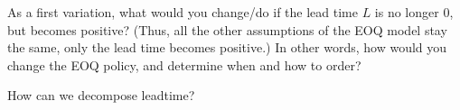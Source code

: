 \begin{exercise}
  As a first variation, what would you change/do if the lead time $L$
  is no longer 0, but becomes positive? (Thus, all the other
  assumptions of the EOQ model stay the same, only the lead time
  becomes positive.)  In other words, how would you change the EOQ
  policy, and determine when and how to order?
  \begin{comment}
    Since the backlog costs are infinite, backlogging is not
    desirable, hence we order early. See the graph: 
\begin{center}
\begin{tikzpicture}[x=0.75cm,y=0.015cm]
\small
\draw[thick,->] (0,0) -- (11,0) node[right] {Time};
\draw[thick,->] (0,0) -- (0,250) node[above] {Inventory};
\draw[] (0,200) -- (0,200) node[left] {$Q$};
\draw[color=blue,thick] (0,200) -- (3,0);
\draw[] (3,0) node[below] {$Q / D$};
\foreach \y in {1,...,3}{
	\draw[color=blue,thick] (3*\y-3,200) -- (3*\y,0);
	\draw[color=green,thick] (3*\y-3+2,200/3) -- (3*\y-3+2,200/3*4) -- (3*\y,200);
	\draw[color=red,thick,<->] (3*\y-3+2,200/3*2) -- (3*\y,200/3*2);
	\draw[] (3*\y-3+2.5,200/3*2) node[below] {$L$};}
\foreach \y in {1,2}{
	\draw[color=blue,thick] (3*\y,0) -- (3*\y,200);}
\foreach \y in {2,3}{
	\draw[] (3*\y,-5) node[below] {\y $Q/D$};}
\draw[] (0,100) node[left] {$Q / 2$};
\draw[color=red,thick] (0,100) -- (10.5,100) node[below] {Average stock};
\draw[] (0,200/3) node[left] {$L D$};
\draw[color=red,thick] (0,200/3) -- (10.5,200/3) node[below] {Re-order level};
\foreach \y in {0,...,2}{
	\draw[color=red,thick,<->] (3*\y+0.15,-45) -- (3*\y+3-0.15,-45);
	\draw[] (3*\y+1.5,-45) -- (3*\y+1.5,-45) node[below] {Cycle};}
\end{tikzpicture}
\end{center}
    
This new policy can be described in a simple way by introducing the
concept of \emph{inventory position}, that is, all stock on-hand plus
the replenishments under way. The green graph above illustrates the
inventory position $IP$. When $IP$ hits the lead time demand $L D$,
i.e., the lead time $L$ times the demand $D$, we should order
$Q$. During the lead time $L$ the demand will be met from on-hand
stock. When the replenishment arrives a lead time $L$ later, it
arrives just in time to meet the demand again .
  \end{comment}
\end{exercise}

\begin{exercise}

How can we decompose leadtime?

\begin{comment}
TBD
\end{comment}

\end{exercise}



